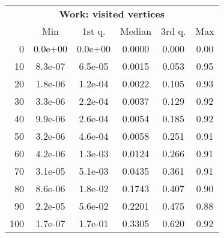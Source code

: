 \begin{tabular}{r|ccccc}
  \multicolumn{6}{c}{{\bf Work: visited vertices}} \\
  & Min & 1st q. & Median & 3rd q. & Max \\ \hline\hline
  0 & 0.0e+00 & 0.0e+00 & 0.0000 & 0.000 & 0.00
\\ 10 & 8.3e-07 & 6.5e-05 & 0.0015 & 0.053 & 0.95
\\ 20 & 1.8e-06 & 1.2e-04 & 0.0022 & 0.105 & 0.93
\\ 30 & 3.3e-06 & 2.2e-04 & 0.0037 & 0.129 & 0.92
\\ 40 & 9.9e-06 & 2.6e-04 & 0.0054 & 0.185 & 0.92
\\ 50 & 3.2e-06 & 4.6e-04 & 0.0058 & 0.251 & 0.91
\\ 60 & 4.2e-06 & 1.3e-03 & 0.0124 & 0.266 & 0.91
\\ 70 & 3.1e-05 & 5.1e-03 & 0.0435 & 0.361 & 0.91
\\ 80 & 8.6e-06 & 1.8e-02 & 0.1743 & 0.407 & 0.90
\\ 90 & 2.2e-05 & 5.6e-02 & 0.2201 & 0.475 & 0.88
\\ 100 & 1.7e-07 & 1.7e-01 & 0.3305 & 0.620 & 0.92
\end{tabular}
